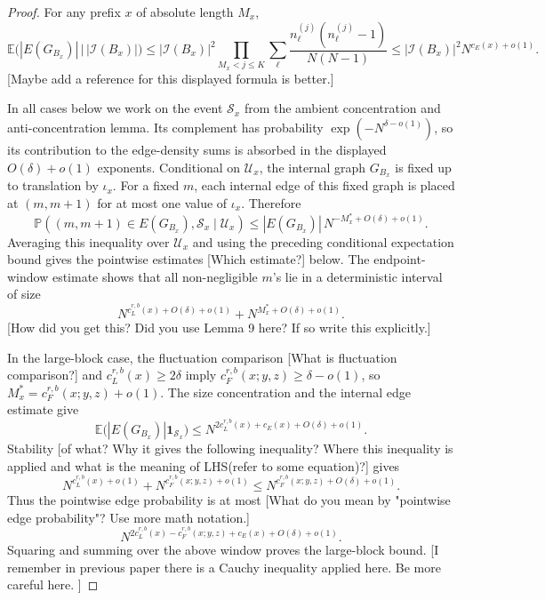 \documentclass[11pt]{article}
\newcommand{\cI}{\mathcal I}
\newcommand{\E}{\mathbb E}
\newcommand{\Pbb}{\mathbb P}
\newcommand{\jscomment}[1]{\textup{\textsf{\color{blue}[#1]}}}
\begin{document}
\begin{proof}
For any prefix \(x\) of absolute length \(M_x\),
\[
    \E\bigl(|E(G_{B_x})|\,\big|\,|\cI(B_x)|\bigr)
    \le
    |\cI(B_x)|^2
    \prod_{M_x<j\le K}\sum_\ell
    \frac{n_\ell^{(j)}(n_\ell^{(j)}-1)}{N(N-1)}
    \le |\cI(B_x)|^2N^{c_E(x)+o(1)} .
\]
\jscomment{Maybe add a reference for this displayed formula is better.}

In all cases below we work on the event \(\mathcal S_x\) from the
ambient concentration and anti-concentration lemma. Its complement has
probability \(\exp(-N^{\delta-o(1)})\), so its contribution to the
edge-density sums is absorbed in the displayed \(O(\delta)+o(1)\)
exponents.
Conditional on \(\mathcal U_x\), the internal graph \(G_{B_x}\) is fixed
up to translation by \(\iota_x\). For a fixed \(m\), each internal edge
of this fixed graph is placed at \((m,m+1)\) for at most one value of
\(\iota_x\). Therefore
\[
    \Pbb((m,m+1)\in E(G_{B_x}),\mathcal S_x\mid\mathcal U_x)
    \le
    |E(G_{B_x})|\,
    N^{-M_x^*+O(\delta)+o(1)} .
\]
Averaging this inequality over \(\mathcal U_x\) and using the preceding
conditional expectation bound gives the pointwise estimates \jscomment{Which estimate?} below. The
endpoint-window estimate shows that
all non-negligible \(m\)'s lie in a deterministic interval of size
\[
    N^{c_L^{r,b}(x)+O(\delta)+o(1)}
    +
    N^{M_x^*+O(\delta)+o(1)} .
\]
\jscomment{How did you get this? Did you use Lemma 9 here? If so write this explicitly.}

In the large-block case, the fluctuation comparison \jscomment{What is fluctuation comparison?} and
\(c_L^{r,b}(x)\ge2\delta\) imply
\(c_F^{r,b}(x;y,z)\ge\delta-o(1)\), so \(M_x^*=c_F^{r,b}(x;y,z)+o(1)\).
The size concentration and the internal edge estimate give
\[
    \E\bigl(|E(G_{B_x})|\mathbf 1_{\mathcal S_x}\bigr)
    \le N^{2c_L^{r,b}(x)+c_E(x)+O(\delta)+o(1)}.
\]
Stability \jscomment{of what? Why it gives the following inequality? Where this inequality is applied and what is the meaning of LHS(refer to some equation)?} gives
\[
    N^{c_L^{r,b}(x)+o(1)}+N^{c_F^{r,b}(x;y,z)+o(1)}
    \le N^{c_F^{r,b}(x;y,z)+O(\delta)+o(1)} .
\]
Thus the pointwise edge probability is at most \jscomment{What do you mean by "pointwise edge probability"? Use more math notation.}
\[
    N^{2c_L^{r,b}(x)-c_F^{r,b}(x;y,z)+c_E(x)+O(\delta)+o(1)}.
\]
Squaring and summing over the above window proves the large-block bound.
\jscomment{I remember in previous paper there is a Cauchy inequality applied here. Be more careful here. }


\end{proof}
\end{document}

